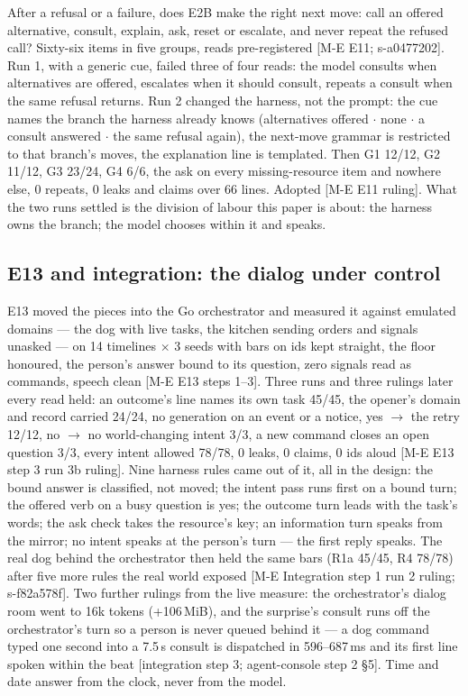 \documentclass[11pt]{article}
\newcommand{\src}[1]{{\footnotesize\textsf{[#1]}}}
\begin{document}
After a refusal or a failure, does E2B make the right next move: call an offered
alternative, consult, explain, ask, reset or escalate, and never repeat the refused call?
Sixty-six items in five groups, reads pre-registered \src{M-E E11; s-a0477202}. Run 1, with
a generic cue, failed three of four reads: the model consults when alternatives are offered,
escalates when it should consult, repeats a consult when the same refusal returns. Run 2
changed the harness, not the prompt: the cue names the branch the harness already knows
(alternatives offered $\cdot$ none $\cdot$ a consult answered $\cdot$ the same refusal
again), the next-move grammar is restricted to that branch's moves, the explanation line is
templated. Then G1 12/12, G2 11/12, G3 23/24, G4 6/6, the ask on every missing-resource
item and nowhere else, 0 repeats, 0 leaks and claims over 66 lines. Adopted \src{M-E E11
ruling}. What the two runs settled is the division of labour this paper is about: the
harness owns the branch; the model chooses within it and speaks.

\subsection{E13 and integration: the dialog under control}\label{sec:e13}

E13 moved the pieces into the Go orchestrator and measured it against emulated domains ---
the dog with live tasks, the kitchen sending orders and signals unasked --- on 14 timelines
$\times$ 3 seeds with bars on ids kept straight, the floor honoured, the person's answer
bound to its question, zero signals read as commands, speech clean \src{M-E E13 steps
1--3}. Three runs and three rulings later every read held: an outcome's line names its own
task 45/45, the opener's domain and record carried 24/24, no generation on an event or a
notice, yes $\to$ the retry 12/12, no $\to$ no world-changing intent 3/3, a new command
closes an open question 3/3, every intent allowed 78/78, 0 leaks, 0 claims, 0 ids aloud
\src{M-E E13 step 3 run 3b ruling}. Nine harness rules came out of it, all in the design:
the bound answer is classified, not moved; the intent pass runs first on a bound turn; the
offered verb on a busy question is yes; the outcome turn leads with the task's words; the
ask check takes the resource's key; an information turn speaks from the mirror; no intent
speaks at the person's turn --- the first reply speaks. The real dog behind the orchestrator
then held the same bars (R1a 45/45, R4 78/78) after five more rules the real world exposed
\src{M-E Integration step 1 run 2 ruling; s-f82a578f}. Two further rulings from the live
measure: the orchestrator's dialog room went to 16k tokens (+106\,MiB), and the surprise's
consult runs off the orchestrator's turn so a person is never queued behind it --- a dog
command typed one second into a 7.5\,s consult is dispatched in 596--687\,ms and its first
line spoken within the beat \src{integration step 3; agent-console step 2 \S5}. Time and
date answer from the clock, never from the model.
\end{document}
